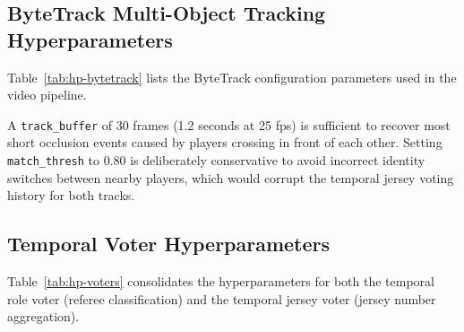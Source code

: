 \subsection{ByteTrack Multi-Object Tracking Hyperparameters}

Table~\ref{tab:hp-bytetrack} lists the ByteTrack configuration parameters
used in the video pipeline.

\begin{table}[H]
    \centering
    \caption{ByteTrack tracker hyperparameters used in the video pipeline.}
    \label{tab:hp-bytetrack}
\end{table}

\noindent A \texttt{track\_buffer} of 30 frames (1.2 seconds at 25 fps)
is sufficient to recover most short occlusion events caused by players
crossing in front of each other. Setting \texttt{match\_thresh} to 0.80
is deliberately conservative to avoid incorrect identity switches
between nearby players, which would corrupt the temporal jersey voting
history for both tracks.

\subsection{Temporal Voter Hyperparameters}

Table~\ref{tab:hp-voters} consolidates the hyperparameters for both the
temporal role voter (referee classification) and the temporal jersey
voter (jersey number aggregation).

